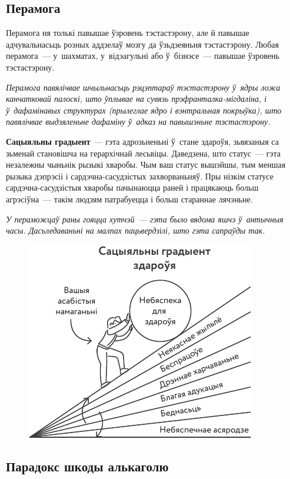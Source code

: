 \subsection*{Перамога}

Перамога ня толькі павышае ўзровень тэстастэрону, але й павышае адчувальнасьць розных аддзелаў мозгу да ўзьдзеяньня тэстастэрону. Любая перамога~--- у~шахматах, у~відэагульні або ў~бізнэсе~--- павышае ўзровень тэстастэрону. 

\emph{Перамога павялічвае шчыльнасьць рэцэптараў тэстастэрону ў~ядры ложа канчатковай палоскі, што ўплывае на сувязь прэфранталка-мігдаліна, і ў~дафамінавых структурах (прылеглае ядро і вэнтральная покрыўка), што павялічвае выдзяленьне дафаміну ў~адказ на павышэньне тэстастэрону.}

\textbf{Сацыяльны градыент}~--- гэта адрозьненьні ў~стане здароўя, зьвязаныя са зьменай становішча на герархічнай лесьвіцы. Даведзена, што статус~--- гэта незалежны чыньнік рызыкі хваробы. Чым ваш статус вышэйшы, тым меншая рызыка дэпрэсіі і сардэчна-сасудзістых захворваньняў. Пры нізкім статусе сардэчна-сасудзістыя хваробы пачынаюцца раней і працякаюць больш агрэсіўна~--- такім людзям патрабуецца і больш стараннае лячэньне.

\emph{У пераможцаў раны гояцца хутчэй~--- гэта было вядома яшчэ ў~антычныя часы. Дасьледаваньні на малпах пацьвердзілі, што гэта сапраўды так.}

\begin{figure}[htb!]
  \centering
  \includegraphics[scale=1.2]{willpower/ch9/3.pdf}
\end{figure}

\subsection*{Парадокс шкоды алькаголю}

